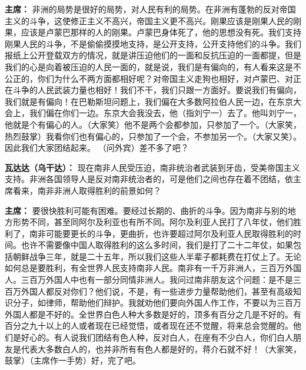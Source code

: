 \begin{duihua}
\item[\textbf{主席：}] 非洲的局势是很好的局势，对人民有利的局势。在非洲有蓬勃的反对帝国主义的斗争，这使修正主义不高兴，帝国主义更不高兴。刚果应该是刚果人民的刚果，应该是卢蒙巴那样的人的刚果。卢蒙巴身体死了，他的思想没有死。我们支持刚果人民的斗争，不是偷偷摸摸地支持，是公开支持，公开支持他们的斗争。我们报纸上公开登载双方的情况，就是讲压迫他们的一面和反抗压迫的一面都提，但是我们的心是向着被压迫的人民一面的，就是说，我们是有偏向的，有人看来这是不公正的，你们为什么不两方面都相好呢？对帝国主义走狗也相好，对卢蒙巴、对正在斗争的人民武装力量也相好！我们不干，我们只跟一方面好。要说我们有偏向，我们就是有偏向！在巴勒斯坦问题上，我们偏在大多数阿拉伯人民一边，在东京大会上，我们偏在你们一边。东京大会我没去，他（指刘宁一）去了。他叫刘宁一，他就是个有偏心的人。（大家笑）他不是两个会都参加，只参加了一个。（大家笑，热烈鼓掌）我看你们也有偏心的，只参加了一个会，不参加另一个。（大家又笑）。因此我们大家团结起来。 （问外宾）差不多了吧？

\item[\textbf{瓦达达（乌干达）：}] 现在南非人民受压迫，南非统治者武装到牙齿，受美帝国主义支持。非洲各国领导人是反对南非统治者的，可是他们之间也存在着不团结，依主席看来，南非非洲人取得胜利的前景如何？

\item[\textbf{主席：}] 要很快胜利可能有困难。要经过长期的、曲折的斗争。因为南非与别的地方形势不同，甚至同阿尔及利亚也有所不同。阿尔及利亚人民打了八年仗，他们胜利了，南非可能要更长的斗争，更曲折，也许要超过阿尔及利亚人民取得胜利的时间。也许不需要像中国人取得胜利的这么多时间，我们是打了二十二年仗，如果包括朝鲜战争三年，就是二十五年，所以我们这些人半辈子都耗费在打仗上了。无论如何总是要胜利，有全世界人民支持南非人民。南非有一千万非洲人，三百万外国人。三百万外国人中也有一部分同情非洲人。我问过南非朋友这个问题：是不是三百万外国人都反对你们？他们说，不是，有一些进步力量帮助他们，甚至有高级知识分子，如律师，帮助他们辩护。我就劝他们要向外国人作工作，不要以为三百万外国人都是不好的。全世界白色人种大多数是好的，顶多有百分之几是不好的。有百分之九十以上的人或者现在已经觉悟，或者现在还不觉醒，将来总会觉醒的。他们是好心的。有人说我们团结有色人种，反对白人，在座有不少白人，你们白人朋友是代表大多数白人的，也并非所有有色人都是好的，蒋介石就不好！（大家笑，鼓掌）（主席作一手势）好，完了吧。
 
\end{duihua}
